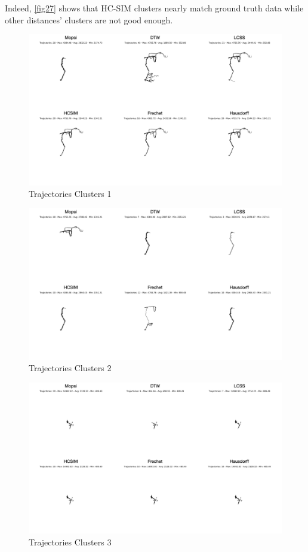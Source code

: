 \documentclass[a4paper, 12pt]{article}
\begin{document}
Indeed, \autoref{fig27} shows that HC-SIM clusters nearly match ground truth data while other distances' clusters are not good enough.

\begin{figure}[htbp!]
    \centering
    \includegraphics[width=1\textwidth]{Mopsi Clusters 1.png}
    \caption{Trajectories Clusters 1}
    \label{fig27}
\end{figure}

\begin{figure}[htbp!]
    \centering
    \includegraphics[width=1\textwidth]{Mopsi Clusters 2.png}
    \caption{Trajectories Clusters 2}
    \label{fig28}
\end{figure}

\begin{figure}[htbp!]
    \centering
    \includegraphics[width=1\textwidth]{Mopsi Clusters 3.png}
    \caption{Trajectories Clusters 3}
    \label{fig29}
\end{figure}
\end{document}
